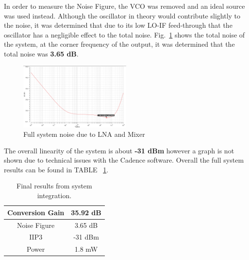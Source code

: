 In order to measure the Noise Figure, the VCO was removed and an ideal source was used instead. Although the oscillator in theory would contribute slightly to the noise, it was determined that due to its low LO-IF feed-through that the oscillator has a negligible effect to the total noise. Fig.~\ref{fig:fullsystemnoise} shows the total noise of the system, at the corner frequency of the output, it was determined that the total noise was {\bf 3.65 dB}.

\begin{figure}[H]
   \centering
    \includegraphics[width=0.5\textwidth]{figures/FullSysNoiseFigure.png}
    \caption{Full system noise due to LNA and Mixer}
    \label{fig:fullsystemnoise}
\end{figure}

The overall linearity of the system is about {\bf -31 dBm} however a graph is not shown due to technical issues with the Cadence software. Overall the full system results can be found in TABLE ~\ref{tab:systemresults}.


\begin{table}[h]
\begin{center}
	\begin{tabular}{ c | c  }

  		Conversion Gain & 35.92 dB \\ \hline
  		Noise Figure & 3.65 dB \\ \hline
  		IIP3 & -31 dBm\\ \hline
		Power & 1.8 mW \\

	\end{tabular}

\end{center}
\caption{Final results from system integration.}
\label{tab:systemresults}
\end{table}

